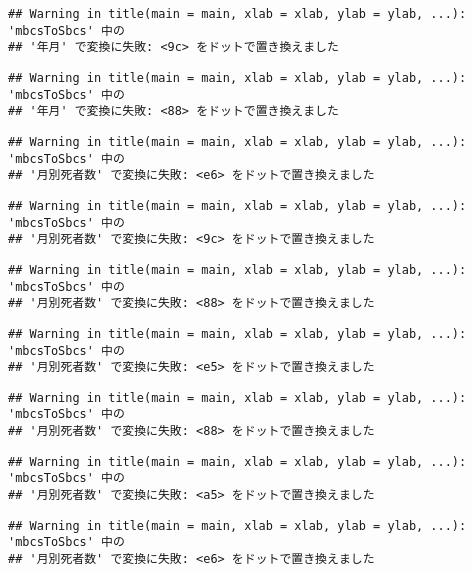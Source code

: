\documentclass[]{article}
\begin{document}
\begin{verbatim}
## Warning in title(main = main, xlab = xlab, ylab = ylab, ...): 'mbcsToSbcs' 中の
## '年月' で変換に失敗: <9c> をドットで置き換えました
\end{verbatim}

\begin{verbatim}
## Warning in title(main = main, xlab = xlab, ylab = ylab, ...): 'mbcsToSbcs' 中の
## '年月' で変換に失敗: <88> をドットで置き換えました
\end{verbatim}

\begin{verbatim}
## Warning in title(main = main, xlab = xlab, ylab = ylab, ...): 'mbcsToSbcs' 中の
## '月別死者数' で変換に失敗: <e6> をドットで置き換えました
\end{verbatim}

\begin{verbatim}
## Warning in title(main = main, xlab = xlab, ylab = ylab, ...): 'mbcsToSbcs' 中の
## '月別死者数' で変換に失敗: <9c> をドットで置き換えました
\end{verbatim}

\begin{verbatim}
## Warning in title(main = main, xlab = xlab, ylab = ylab, ...): 'mbcsToSbcs' 中の
## '月別死者数' で変換に失敗: <88> をドットで置き換えました
\end{verbatim}

\begin{verbatim}
## Warning in title(main = main, xlab = xlab, ylab = ylab, ...): 'mbcsToSbcs' 中の
## '月別死者数' で変換に失敗: <e5> をドットで置き換えました
\end{verbatim}

\begin{verbatim}
## Warning in title(main = main, xlab = xlab, ylab = ylab, ...): 'mbcsToSbcs' 中の
## '月別死者数' で変換に失敗: <88> をドットで置き換えました
\end{verbatim}

\begin{verbatim}
## Warning in title(main = main, xlab = xlab, ylab = ylab, ...): 'mbcsToSbcs' 中の
## '月別死者数' で変換に失敗: <a5> をドットで置き換えました
\end{verbatim}

\begin{verbatim}
## Warning in title(main = main, xlab = xlab, ylab = ylab, ...): 'mbcsToSbcs' 中の
## '月別死者数' で変換に失敗: <e6> をドットで置き換えました
\end{verbatim}
\end{document}
